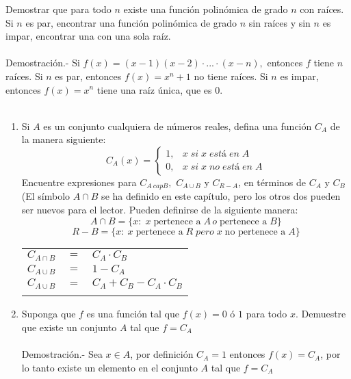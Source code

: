 \begin{teo}
Demostrar que para todo $n$ existe una función polinómica de grado $n$ con raíces. Si $n$ es par, encontrar una función polinómica de grado $n$ sin raíces y sin $n$ es impar, encontrar una con una sola raíz.\\\\
Demostración.- \; Si $f(x) = (x-1)(x-2) \cdot ... \cdot (x-n),$ entonces $f$ tiene $n$ raíces. Si $n$ es par, entonces $f(x) = x^n + 1$ no tiene raíces. Si $n$ es impar, entonces $f(x)=x^n$ tiene una raíz única, que es $0.$\\\\ 
\end{teo}

\begin{teo}
\begin{enumerate}[\bfseries a)]
\item Si $A$ es un conjunto cualquiera de números reales, defina una función $C_A$ de la manera siguiente:
\begin{equation}
C_A(x) = \left\lbrace
\begin{array}{rr}
1, & x \; si \; x \; está \; en \; A\\
0, & x \; si \; x \; no \; está \; en \; A
\end{array}
\right.
\end{equation}
Encuentre expresiones para $C_{A\ cap B},$   $C_{A\cup B}$ \; y \; $C_{R-A}$, en términos de $C_A$ \; y \; $C_B$ (El símbolo $A \cap B$ se ha definido en este capítulo, pero los otros dos pueden ser nuevos para el lector. Pueden definirse de la siguiente manera:
$$A \cap B = \lbrace x: \; x \; \mbox{pertenece a} \; A \, o \; \mbox{pertenece a} \; B \rbrace$$
$$R - B = \lbrace x: \: x \; \mbox{pertenece a} \; R \; pero \; x \; \mbox{no pertenece a} \; A \rbrace$$
\begin{center}
\begin{tabular}{r c l}
$C_{A \cap B}$&$=$&$C_A \cdot C_B$\\
$C_{A \cup B}$&$=$&$1 - C_A$\\
$C_{A \cup B}$&$=$&$C_A + C_B - C_A \cdot C_B$\\\\
\end{tabular}
\end{center}

\item Suponga que $f$ es una función tal que $f(x) = 0$ ó $1$ para todo $x$. Demuestre que existe un
conjunto $A$ tal que $f = C_A$\\\\
Demostración.- \;  Sea $x \in A$, por definición $C_A = 1$ entonces $f(x)=C_A$, por lo tanto existe un elemento en el conjunto $A$ tal que $f=C_A$\\\\


\end{enumerate}
\end{teo}
